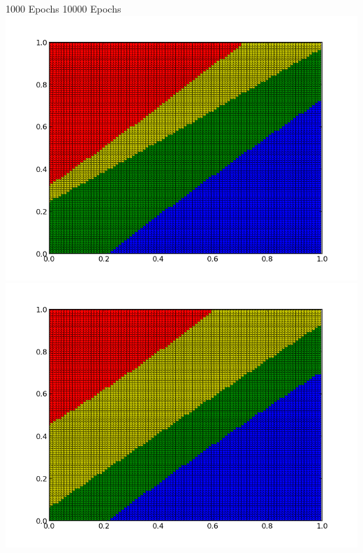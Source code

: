 \documentclass{book}
\begin{document}
\hspace{100px}1000 Epochs \hspace{120px}10000 Epochs\\
\includegraphics[scale=0.25]{1000classregions.png}
\includegraphics[scale=0.25]{10000classregions.png}
\end{document}
